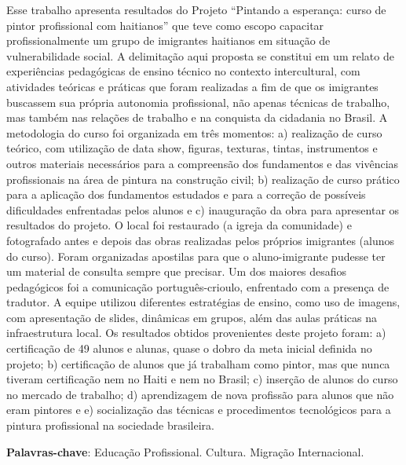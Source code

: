 \documentclass[article,12pt,onesidea,4paper,english,brazil]{abntex2}
\begin{document}
	\noindent Esse trabalho apresenta resultados do Projeto “Pintando a esperança: curso de pintor profissional com haitianos” que teve como escopo capacitar profissionalmente um grupo de imigrantes haitianos em situação de vulnerabilidade social. A delimitação aqui proposta se constitui em um relato de experiências pedagógicas de ensino técnico no contexto intercultural, com atividades teóricas e práticas que foram realizadas a fim de que os imigrantes buscassem sua própria autonomia profissional, não apenas técnicas de trabalho, mas também nas relações de trabalho e na conquista da cidadania no Brasil. A metodologia do curso foi organizada em três momentos: a) realização de curso teórico, com utilização de data show, figuras, texturas, tintas, instrumentos e outros materiais necessários para a compreensão dos fundamentos e das vivências profissionais na área de pintura na construção civil; b) realização de curso prático para a aplicação dos fundamentos estudados e para a correção de possíveis dificuldades enfrentadas pelos alunos e c) inauguração da obra para apresentar os resultados do projeto. O local foi restaurado (a igreja da comunidade) e fotografado antes e depois das obras realizadas pelos próprios imigrantes (alunos do curso). Foram organizadas apostilas para que o aluno-imigrante pudesse ter um material de consulta sempre que precisar. Um dos maiores desafios pedagógicos foi a comunicação português-crioulo, enfrentado com a presença de tradutor. A equipe utilizou diferentes estratégias de ensino, como uso de imagens, com apresentação de slides, dinâmicas em grupos, além das aulas práticas na infraestrutura local.  Os resultados obtidos provenientes deste projeto foram: a) certificação de 49 alunos e alunas, quase o dobro da meta inicial definida no projeto; b) certificação de alunos que já trabalham como pintor, mas que nunca tiveram certificação nem no Haiti e nem no Brasil; c) inserção de alunos do curso no mercado de trabalho; d) aprendizagem de nova profissão para alunos que não eram pintores e e) socialização das técnicas e procedimentos tecnológicos para a pintura profissional na sociedade brasileira.
	
	\vspace{\onelineskip}
	
	\noindent
	\textbf{Palavras-chave}: Educação Profissional. Cultura. Migração Internacional.
	
\end{document}
